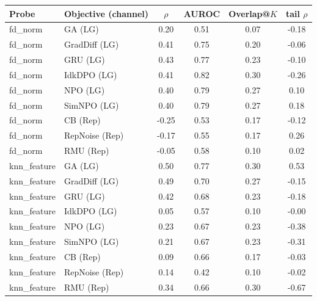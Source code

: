 \begin{tabular}{llcccc}
\toprule
Probe & Objective (channel) & $\rho$ & AUROC & Overlap@$K$ & tail $\rho$ \\
\midrule
fd\_norm & GA (LG) & 0.20 & 0.51 & 0.07 & -0.18 \\
fd\_norm & GradDiff (LG) & 0.41 & 0.75 & 0.20 & -0.06 \\
fd\_norm & GRU (LG) & 0.43 & 0.77 & 0.23 & -0.10 \\
fd\_norm & IdkDPO (LG) & 0.41 & 0.82 & 0.30 & -0.26 \\
fd\_norm & NPO (LG) & 0.40 & 0.79 & 0.27 & 0.10 \\
fd\_norm & SimNPO (LG) & 0.40 & 0.79 & 0.27 & 0.18 \\
fd\_norm & CB (Rep) & -0.25 & 0.53 & 0.17 & -0.12 \\
fd\_norm & RepNoise (Rep) & -0.17 & 0.55 & 0.17 & 0.26 \\
fd\_norm & RMU (Rep) & -0.05 & 0.58 & 0.10 & 0.02 \\
knn\_feature & GA (LG) & 0.50 & 0.77 & 0.30 & 0.53 \\
knn\_feature & GradDiff (LG) & 0.49 & 0.70 & 0.27 & -0.15 \\
knn\_feature & GRU (LG) & 0.42 & 0.68 & 0.23 & -0.18 \\
knn\_feature & IdkDPO (LG) & 0.05 & 0.57 & 0.10 & -0.00 \\
knn\_feature & NPO (LG) & 0.23 & 0.67 & 0.23 & -0.38 \\
knn\_feature & SimNPO (LG) & 0.21 & 0.67 & 0.23 & -0.31 \\
knn\_feature & CB (Rep) & 0.09 & 0.66 & 0.17 & -0.03 \\
knn\_feature & RepNoise (Rep) & 0.14 & 0.42 & 0.10 & -0.02 \\
knn\_feature & RMU (Rep) & 0.34 & 0.66 & 0.30 & -0.67 \\
\bottomrule
\end{tabular}
